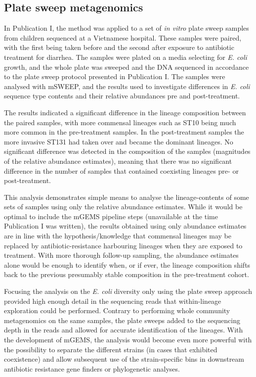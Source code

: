 \documentclass[officiallayout]{tktla}
\begin{document}
\subsection{Plate sweep metagenomics}

In Publication I, the method was applied to a set of \textit{in vitro}
plate sweep samples from children sequenced at a Vietnamese
hospital. These samples were paired, with the first being taken before
and the second after exposure to antibiotic treatment for
diarrhea. The samples were plated on a media selecting for
\textit{E. coli} growth, and the whole plate was sweeped and the DNA
sequenced in accordance to the plate sweep protocol presented in
Publication I. The samples were analysed with mSWEEP, and the results
used to investigate differences in \textit{E. coli} sequence type
contents and their relative abundances pre and post-treatment.

The results indicated a significant difference in the lineage
composition between the paired samples, with more commensal lineages
such as ST10 \citep{maklin_strong_2022} being much more common in the
pre-treatment samples. In the post-treatment samples the more invasive
ST131 \citep{maklin_strong_2022} had taken over and became the
dominant lineages. No significant difference was detected in the
composition of the samples (magnitudes of the relative abundance
estimates), meaning that there was no significant difference in the
number of samples that contained coexisting lineages pre- or
post-treatment.

This analysis demonstrates simple means to analyse the
lineage-contents of some sets of samples using only the relative
abundance estimates. While it would be optimal to include the mGEMS
pipeline steps (unavailable at the time Publication I was written), the
results obtained using only abundance estimates are in line with the
hypothesis/knowledge that commensal lineages may be replaced by
antibiotic-resistance harbouring lineages when they are exposed to
treatment. With more thorough follow-up sampling, the abundance
estimates alone would be enough to identify when, or if ever, the
lineage composition shifts back to the previous presumably stable
composition in the pre-treatment cohort.

Focusing the analysis on the \textit{E. coli} diversity only using the
plate sweep approach provided high enough detail in the sequencing
reads that within-lineage exploration could be performed. Contrary to
performing whole community metagenomics on the same samples, the plate sweeps
added to the sequencing depth in the reads and allowed for accurate
identification of the lineages. With the development of mGEMS, the
analysis would become even more powerful with the possibility to
separate the different strains (in cases that exhibited coexistence)
and allow subsequent use of the strain-specific bins in downstream
antibiotic resistance gene finders or phylogenetic analyses.
\end{document}
